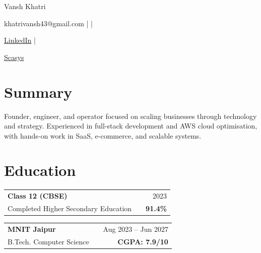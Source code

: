 \documentclass[a4paper,10pt]{article}
\begin{document}

\begin{center}

{\Huge \textcolor[HTML]{1C033C}{Vansh Khatri}} \\[4pt]



\textcolor[HTML]{371e77}{

khatrivansh43@gmail.com \quad |  \quad | \quad

\href{https://www.linkedin.com/in/vansh-khatri-3589b1282/}{LinkedIn} \quad | \quad

\href{https://scasys.in}{Scasys}

}

\end{center}




\section{Summary}

Founder, engineer, and operator focused on scaling businesses through technology and strategy. Experienced in full-stack development and AWS cloud optimisation, with hands-on work in SaaS, e-commerce, and scalable systems.




\section{Education}

\begin{tabularx}{\linewidth}{@{}l X r@{}}

\textbf{Class 12 (CBSE)} & & 2023 \\

Completed Higher Secondary Education & & \textbf{91.4\%} \\

\end{tabularx}



\vspace{2pt}



\begin{tabularx}{\linewidth}{@{}l X r@{}}

\textbf{MNIT Jaipur} & & Aug 2023 -- Jun 2027 \\

B.Tech. Computer Science & & \textbf{CGPA: 7.9/10} \\

\end{tabularx}
\end{document}
